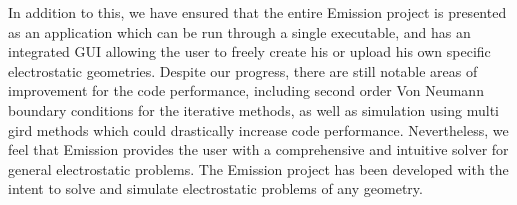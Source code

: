 \documentclass[a4paper]{article}
\begin{document}
In addition to this, we have ensured that the entire Emission project is 
presented as an application which can be run through a single executable, and 
has an integrated GUI allowing the user to freely create his or upload his own 
specific electrostatic geometries. Despite our progress, there are still 
notable areas of improvement for the code performance, including second order 
Von Neumann boundary conditions for the iterative methods, as well as 
simulation using multi gird methods which could drastically increase code 
performance. Nevertheless, we feel that Emission provides the user with a 
comprehensive and intuitive solver for general electrostatic problems.
The Emission project has been developed with the intent to solve and simulate 
electrostatic problems of any geometry.

\pagebreak

\end{document}

